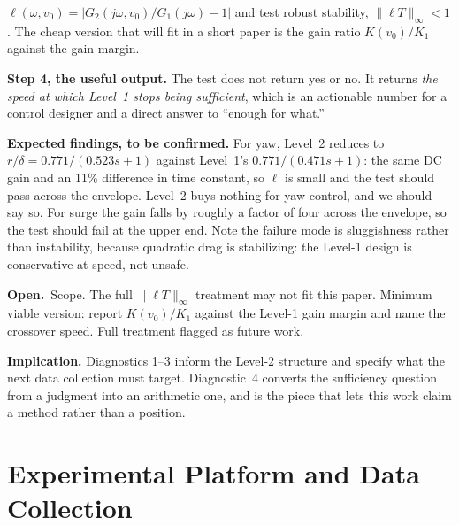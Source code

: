 \documentclass[11pt]{article}
\newcommand{\Open}{\textbf{Open.}\ }
\begin{document}
\begin{outline}
\begin{outline}
    $\ell(\omega, v_0) = |G_2(j\omega, v_0)/G_1(j\omega) - 1|$ and test robust
    stability, $\|\ell T\|_\infty < 1$. The cheap version that will fit in a short
    paper is the gain ratio $K(v_0)/K_1$ against the gain margin.
  \item \textbf{Step 4, the useful output.} The test does not return yes or no. It
    returns \emph{the speed at which Level~1 stops being sufficient}, which is an
    actionable number for a control designer and a direct answer to ``enough for
    what.''
  \item \textbf{Expected findings, to be confirmed.} For yaw, Level~2 reduces to
    $r/\delta = 0.771/(0.523 s + 1)$ against Level~1's $0.771/(0.471 s + 1)$: the
    same DC gain and an 11\% difference in time constant, so $\ell$ is small and the
    test should pass across the envelope. Level~2 buys nothing for yaw control, and
    we should say so. For surge the gain falls by roughly a factor of four across the
    envelope, so the test should fail at the upper end. Note the failure mode is
    sluggishness rather than instability, because quadratic drag is stabilizing: the
    Level-1 design is conservative at speed, not unsafe.
  \item \Open Scope. The full $\|\ell T\|_\infty$ treatment may not fit this paper.
    Minimum viable version: report $K(v_0)/K_1$ against the Level-1 gain margin and
    name the crossover speed. Full treatment flagged as future work.
  \end{outline}
\item \textbf{Implication.} Diagnostics 1--3 inform the Level-2 structure and specify
  what the next data collection must target. Diagnostic~4 converts the sufficiency
  question from a judgment into an arithmetic one, and is the piece that lets this
  work claim a method rather than a position.
\end{outline}

\section{Experimental Platform and Data Collection}
\label{sec:experiment}
\end{document}
